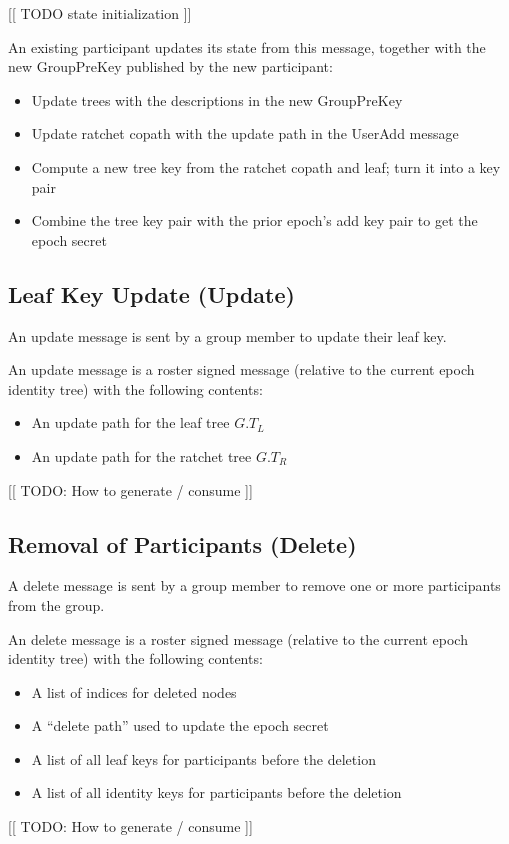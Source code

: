 \documentclass[11pt, oneside]{article}
\begin{document}
[[ TODO state initialization ]]

An existing participant updates its state from this message, together with the new GroupPreKey published by the new participant:

\begin{itemize}
\item{Update trees with the descriptions in the new GroupPreKey}
\item{Update ratchet copath with the update path in the UserAdd message}
\item{Compute a new tree key from the ratchet copath and leaf; turn it into a key pair}
\item{Combine the tree key pair with the prior epoch's add key pair to get the epoch secret}
\end{itemize}


\subsection{Leaf Key Update (Update)}

An update message is sent by a group member to update their leaf key.  

An update message is a roster signed message (relative to the current epoch identity tree) with the following contents:

\begin{itemize}
\item{An update path for the leaf tree $G.T_L$}
\item{An update path for the ratchet tree $G.T_R$}
\end{itemize}

[[ TODO: How to generate / consume ]]


\subsection{Removal of Participants (Delete)}

A delete message is sent by a group member to remove one or more participants from the group.

An delete message is a roster signed message (relative to the current epoch identity tree) with the following contents:

\begin{itemize}
\item{A list of indices for deleted nodes}
\item{A ``delete path'' used to update the epoch secret}
\item{A list of all leaf keys for participants before the deletion}
\item{A list of all identity keys for participants before the deletion}
\end{itemize}

[[ TODO: How to generate / consume ]]
\end{document}
